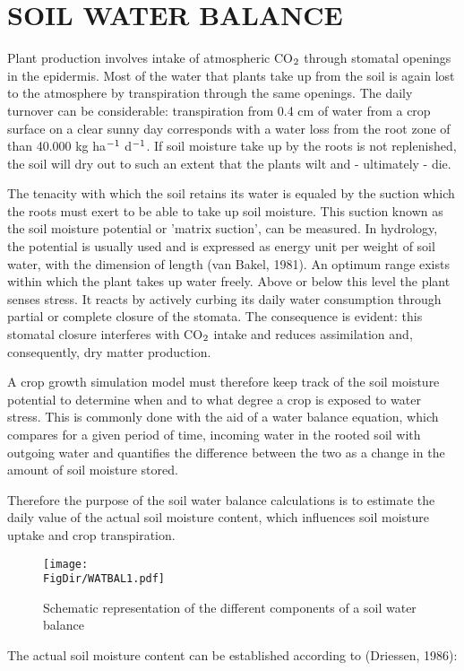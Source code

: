 \chapter{SOIL WATER BALANCE}

Plant production involves intake of atmospheric CO$_{{\rm 2}}$ through stomatal openings in the
epidermis. Most of the water that plants take up from the soil is again lost to the
atmosphere by transpiration through the same openings. The daily turnover can be
considerable: transpiration from 0.4 cm of water from a crop surface on a clear sunny
day corresponds with a water loss from the root zone of than 40.000 kg ha$^{{\rm -1}}$ 
d$^{{\rm -1}}$. If soil
moisture take up by the roots is not replenished, the soil will dry out to such an extent
that the plants wilt and - ultimately - die.

The tenacity with which the soil retains its water is equaled by the suction which the
roots must exert to be able to take up soil moisture. This suction known as the soil
moisture potential or 'matrix suction', can be measured. In hydrology, the potential is
usually used and is expressed as energy unit per weight of soil water, with the dimension
of length (van Bakel, 1981). An optimum range exists within which the plant takes up
water freely. Above or below this level the plant senses stress. It reacts by actively
curbing its daily water consumption through partial or complete closure of the stomata.
The consequence is evident: this stomatal closure interferes with CO$_{{\rm 2}}$ intake and 
reduces assimilation and, consequently, dry matter production.

A crop growth simulation model must therefore keep track of the soil moisture potential
to determine when and to what degree a crop is exposed to water stress. This is common\-ly 
done with the aid of a water balance equation, which compares for a given period of
time, incoming water in the rooted soil with outgoing water and quantifies the difference
between the two as a change in the amount of soil moisture stored.

Therefore the purpose of the soil water balance calculations is to estimate the daily value
of the actual soil moisture content, which influences soil moisture uptake and crop
transpiration.

\begin{figure}[p]
\centering
\texttt{[image: \\FigDir/WATBAL1.pdf]}
\caption{Sche\-matic repre\-senta\-tion of the differ\-ent compo\-nents of a soil water balance}
\label{fig:WatBalSchematic}
\end{figure}
The actual soil moisture content can be established according to (Driessen, 1986):

